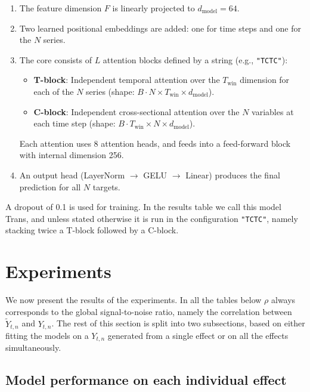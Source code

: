 \documentclass{article}
\begin{document}
\begin{enumerate}
    \item The feature dimension $F$ is linearly projected to $d_{\text{model}} = 64$.
    \item Two learned positional embeddings are added: one for time steps and one for the $N$ series.
    \item The core consists of $L$ attention blocks defined by a string (e.g., \texttt{"TCTC"}):
    \begin{itemize}
        \item \textbf{T-block}: Independent temporal attention over the $T_{\text{win}}$ dimension for each of the $N$ series (shape: $B \cdot N \times T_{\text{win}} \times d_{\text{model}}$).
        \item \textbf{C-block}: Independent cross-sectional attention over the $N$ variables at each time step (shape: $B \cdot T_{\text{win}} \times N \times d_{\text{model}}$).
    \end{itemize}
    Each attention uses $8$ attention heads, and feeds into a feed-forward block with internal dimension 256.
    \item An output head (LayerNorm $\to$ GELU $\to$ Linear) produces the final prediction for all $N$ targets.
\end{enumerate}
A dropout of 0.1 is used for training. In the results table we call this model Trans, and unless stated otherwise it is run in the configuration \texttt{"TCTC"}, namely stacking twice a T-block followed by a C-block.



\section{Experiments}\label{sec_results}

We now present the results of the experiments. In all the tables below $\rho$ always corresponds to the global signal-to-noise ratio, namely the correlation between $\widetilde Y_{t,n}$ and $Y_{t,n}$. The rest of this section is split into two subsections, based on either fitting the models on a $Y_{t,n}$ generated from a single effect or on all the effects simultaneously.

\subsection{Model performance on each individual effect}
\end{document}
